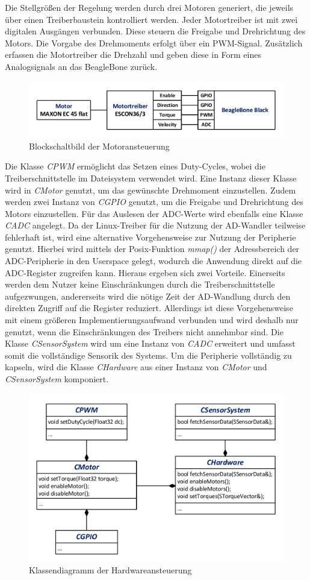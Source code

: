 Die Stellgrößen der Regelung werden durch drei Motoren generiert, die jeweils über einen Treiberbaustein kontrolliert werden. Jeder Motortreiber ist mit zwei digitalen Ausgängen verbunden. Diese steuern die Freigabe und Drehrichtung des Motors. Die Vorgabe des Drehmoments erfolgt über ein PWM-Signal. Zusätzlich erfassen die Motortreiber die Drehzahl und geben diese in Form eines Analogsignals an das BeagleBone zurück.
\begin{figure}[!h]
\centering
\includegraphics[width=0.7\linewidth]{img/SW_0_Motoren_BSB.pdf}
\caption{Blockschaltbild der Motoransteuerung} 
\end{figure}
Die Klasse \textit{CPWM} ermöglicht das Setzen eines Duty-Cycles, wobei die Treiberschnittstelle im Dateisystem verwendet wird. Eine Instanz dieser Klasse wird in \textit{CMotor} genutzt, um das gewünschte Drehmoment einzustellen. Zudem werden zwei Instanz von \textit{CGPIO} genutzt, um die Freigabe und Drehrichtung des Motors einzustellen. Für das Auslesen der ADC-Werte wird ebenfalls eine Klasse \textit{CADC} angelegt. Da der Linux-Treiber für die Nutzung der AD-Wandler teilweise fehlerhaft ist, wird eine alternative Vorgehensweise zur Nutzung der Peripherie genutzt. Hierbei wird mittels der Posix-Funktion \textit{mmap()} der Adressbereich der ADC-Peripherie in den Userspace gelegt, wodurch die Anwendung direkt auf die ADC-Register zugreifen kann. Hieraus ergeben sich zwei Vorteile. Einerseits werden dem Nutzer keine Einschränkungen durch die Treiberschnittstelle aufgezwungen, andererseits wird die nötige Zeit der AD-Wandlung durch den direkten Zugriff auf die Register reduziert. Allerdings ist diese Vorgehensweise mit einem größeren Implementierungsaufwand verbunden und wird deshalb nur genutzt, wenn die Einschränkungen des Treibers nicht annehmbar sind.
Die Klasse \textit{CSensorSystem} wird um eine Instanz von \textit{CADC} erweitert und umfasst somit die vollständige Sensorik des Systems. Um die Peripherie vollständig zu kapseln, wird die Klasse \textit{CHardware} aus einer Instanz von \textit{CMotor} und \textit{CSensorSystem} komponiert.
\begin{figure}[!h]
\centering
\includegraphics[width=0.7\linewidth]{img/SW_0_Hardware_KD.pdf}
\caption{Klassendiagramm der Hardwareansteuerung}
\end{figure}